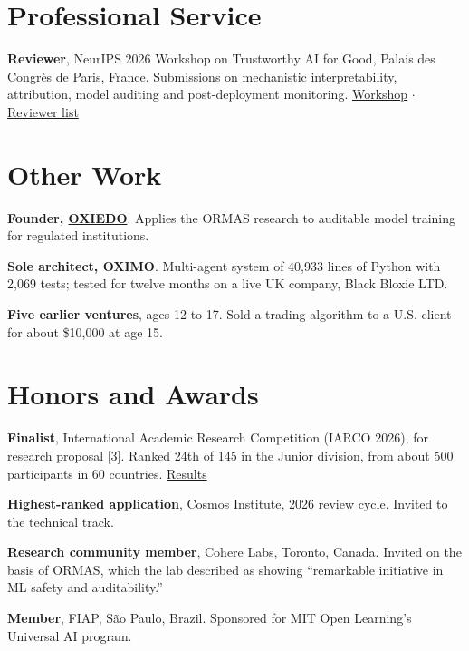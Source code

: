 \documentclass[10pt,a4paper]{article}
\newcommand{\cvitem}[3]{%
  \begin{list}{}{%
    \setlength{\leftmargin}{2.35cm}%
    \setlength{\labelwidth}{2.1cm}%
    \setlength{\labelsep}{0.25cm}%
    \setlength{\itemindent}{0pt}%
    \setlength{\listparindent}{0pt}%
    \setlength{\rightmargin}{0pt}%
    \setlength{\topsep}{0pt}%
    \setlength{\partopsep}{0pt}%
    \setlength{\parsep}{0pt}%
    \setlength{\itemsep}{0pt}%
  }%
  \item[{\makebox[2.1cm][l]{\footnotesize\color{muted}#1}}]%
  #2
  #3
  \end{list}%
  \vspace{1.5pt}
}
\begin{document}
\section*{Professional Service}
\cvitem{2026}{%
  \textbf{Reviewer}, NeurIPS 2026 Workshop on Trustworthy AI for Good, Palais des Congr\`es de Paris, France. Submissions on mechanistic interpretability, attribution, model auditing and post-deployment monitoring. \href{https://trustworthy-ai-for-good.github.io/}{Workshop} $\cdot$ \href{https://trustworthy-ai-for-good.github.io/\#reviewers}{Reviewer list}
}{}

\section*{Other Work}
\cvitem{2023--present}{%
  \textbf{Founder, \href{https://oxiedo.com}{OXIEDO}}. Applies the ORMAS research to auditable model training for regulated institutions.
}{}
\cvitem{2023--2026}{%
  \textbf{Sole architect, OXIMO}. Multi-agent system of 40,933 lines of Python with 2,069 tests; tested for twelve months on a live UK company, Black Bloxie LTD.
}{}
\cvitem{2020--2025}{%
  \textbf{Five earlier ventures}, ages 12 to 17. Sold a trading algorithm to a U.S. client for about \$10,000 at age 15.
}{}

\section*{Honors and Awards}
\cvitem{2026}{\textbf{Finalist}, International Academic Research Competition (IARCO 2026), for research proposal [3]. Ranked 24th of 145 in the Junior division, from about 500 participants in 60 countries. \href{https://iarco.org/2026-winners}{Results}}{}
\cvitem{2026}{\textbf{Highest-ranked application}, Cosmos Institute, 2026 review cycle. Invited to the technical track.}{}
\cvitem{2026}{\textbf{Research community member}, Cohere Labs, Toronto, Canada. Invited on the basis of ORMAS, which the lab described as showing ``remarkable initiative in ML safety and auditability.''}{}
\cvitem{2026}{\textbf{Member}, FIAP, S\~ao Paulo, Brazil. Sponsored for MIT Open Learning's Universal AI program.}{}
\end{document}
